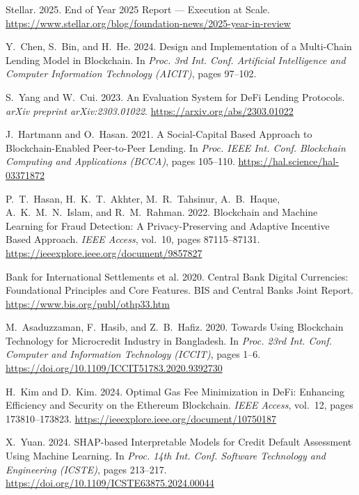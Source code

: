 \documentclass[12pt,a4paper]{report}
\begin{document}
{\begin{enumerate}[label={[\arabic*]}]
\item Stellar. 2025. End of Year 2025 Report --- Execution at Scale. \url{https://www.stellar.org/blog/foundation-news/2025-year-in-review}


\item Y.~Chen, S.~Bin, and H.~He. 2024. Design and Implementation of a Multi-Chain Lending Model in Blockchain. In \emph{Proc. 3rd Int. Conf. Artificial Intelligence and Computer Information Technology (AICIT)}, pages 97--102.


\item S.~Yang and W.~Cui. 2023. An Evaluation System for DeFi Lending Protocols. \emph{arXiv preprint arXiv:2303.01022}. \url{https://arxiv.org/abs/2303.01022}


\item J.~Hartmann and O.~Hasan. 2021. A Social-Capital Based Approach to Blockchain-Enabled Peer-to-Peer Lending. In \emph{Proc. IEEE Int. Conf. Blockchain Computing and Applications (BCCA)}, pages 105--110. \url{https://hal.science/hal-03371872}


\item P.~T.~Hasan, H.~K.~T.~Akhter, M.~R.~Tahsinur, A.~B.~Haque, A.~K.~M.~N.~Islam, and R.~M.~Rahman. 2022. Blockchain and Machine Learning for Fraud Detection: A Privacy-Preserving and Adaptive Incentive Based Approach. \emph{IEEE Access}, vol.~10, pages 87115--87131. \url{https://ieeexplore.ieee.org/document/9857827}


\item Bank for International Settlements et al. 2020. Central Bank Digital Currencies: Foundational Principles and Core Features. BIS and Central Banks Joint Report. \url{https://www.bis.org/publ/othp33.htm}


\item M.~Asaduzzaman, F.~Hasib, and Z.~B.~Hafiz. 2020. Towards Using Blockchain Technology for Microcredit Industry in Bangladesh. In \emph{Proc. 23rd Int. Conf. Computer and Information Technology (ICCIT)}, pages 1--6. \url{https://doi.org/10.1109/ICCIT51783.2020.9392730}


\item H.~Kim and D.~Kim. 2024. Optimal Gas Fee Minimization in DeFi: Enhancing Efficiency and Security on the Ethereum Blockchain. \emph{IEEE Access}, vol.~12, pages 173810--173823. \url{https://ieeexplore.ieee.org/document/10750187}


\item X.~Yuan. 2024. SHAP-based Interpretable Models for Credit Default Assessment Using Machine Learning. In \emph{Proc. 14th Int. Conf. Software Technology and Engineering (ICSTE)}, pages 213--217. \url{https://doi.org/10.1109/ICSTE63875.2024.00044}



\end{enumerate}}
\end{document}
